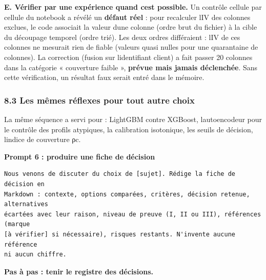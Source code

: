 \documentclass[
  french,
  11pt,
  a4paper,
]{article}
\begin{document}
\textbf{E. Vérifier par une expérience quand c\textquotesingle est
possible.} Un contrôle cellule par cellule du notebook a révélé un
\textbf{défaut réel} : pour recalculer l\textquotesingle IV des colonnes
exclues, le code associait la valeur d\textquotesingle une colonne
(ordre brut du fichier) à la cible du découpage temporel (ordre trié).
Les deux ordres différaient : l\textquotesingle IV de ces colonnes ne
mesurait rien de fiable (valeurs quasi nulles pour une quarantaine de
colonnes). La correction (fusion sur l\textquotesingle identifiant
client) a fait passer 20 colonnes dans la catégorie « couverture faible
», \textbf{prévue mais jamais déclenchée}. Sans cette vérification, un
résultat faux serait entré dans le mémoire.

\subsubsection{8.3 Les mêmes réflexes pour tout autre
choix}\label{83-les-muxeames-ruxe9flexes-pour-tout-autre-choix}

La même séquence a servi pour : LightGBM contre XGBoost,
l\textquotesingle autoencodeur pour le contrôle des profils atypiques,
la calibration isotonique, les seuils de décision,
l\textquotesingle indice de couverture ρc.

\textbf{Prompt 6 : produire une fiche de décision}

\begin{Verbatim}[breaklines=true,breakanywhere=true,fontsize=\small,frame=leftline,framerule=1.6pt,rulecolor=\color{credixblue},framesep=3mm,xleftmargin=2mm,xrightmargin=1mm]
Nous venons de discuter du choix de [sujet]. Rédige la fiche de décision en
Markdown : contexte, options comparées, critères, décision retenue, alternatives
écartées avec leur raison, niveau de preuve (I, II ou III), références (marque
[à vérifier] si nécessaire), risques restants. N'invente aucune référence
ni aucun chiffre.
\end{Verbatim}

\textbf{Pas à pas : tenir le registre des décisions.}
\end{document}
